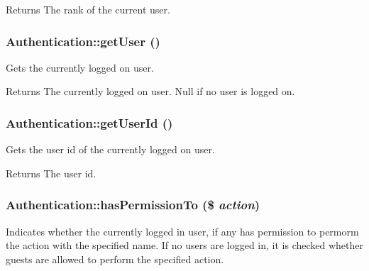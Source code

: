 \begin{DoxyReturn}{Returns}
The rank of the current user. 
\end{DoxyReturn}
\hypertarget{classAuthentication_a3da927c6d0643db0d0048b5c21a92f93}{
\subsubsection[{getUser}]{\setlength{\rightskip}{0pt plus 5cm}Authentication::getUser ()}}
\label{classAuthentication_a3da927c6d0643db0d0048b5c21a92f93}
Gets the currently logged on user.

\begin{DoxyReturn}{Returns}
The currently logged on user. Null if no user is logged on. 
\end{DoxyReturn}
\hypertarget{classAuthentication_aca16ed99ec2ce7b7a0213a4c718af004}{
\subsubsection[{getUserId}]{\setlength{\rightskip}{0pt plus 5cm}Authentication::getUserId ()}}
\label{classAuthentication_aca16ed99ec2ce7b7a0213a4c718af004}
Gets the user id of the currently logged on user.

\begin{DoxyReturn}{Returns}
The user id. 
\end{DoxyReturn}
\hypertarget{classAuthentication_ad5d1fba33f4df315084335f57025eec6}{
\subsubsection[{hasPermissionTo}]{\setlength{\rightskip}{0pt plus 5cm}Authentication::hasPermissionTo (\$ {\em action})}}
\label{classAuthentication_ad5d1fba33f4df315084335f57025eec6}
Indicates whether the currently logged in user, if any has permission to permorm the action with the specified name. If no users are logged in, it is checked whether guests are allowed to perform the specified action.


